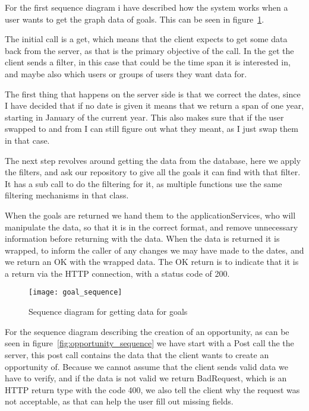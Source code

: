 For the first sequence diagram i have described how the system works when a user
wants to get the graph data of goals. This can be seen in
figure~\ref{fig:goal_sequence}.

The initial call is a get, which means that the client expects to get some data
back from the server, as that is the primary objective of the call. In the get
the client sends a filter, in this case that could be the time span it is
interested in, and maybe also which users or groups of users they want data for.

The first thing that happens on the server side is that we correct the dates,
since I have decided that if no date is given it means that we return a span of
one year, starting in January of the current year. This also makes sure that if
the user swapped to and from I can still figure out what they meant, as I just
swap them in that case. 

The next step revolves around getting the data from the database, here we apply
the filters, and ask our repository to give all the goals it can find with that
filter. It has a sub call to do the filtering for it, as multiple functions use
the same filtering mechanisms in that class.

When the goals are returned we hand them to the applicationServices, who will
manipulate the data, so that it is in the correct format, and remove unnecessary
information before returning with the data. When the data is returned it is
wrapped, to inform the caller of any changes we may have made to the dates, and
we return an OK with the wrapped data. The OK return is to indicate that it is a
return via the HTTP connection, with a status code of 200.

\begin{figure}[!htbp]
\centering
\texttt{[image: goal\_sequence]}
\caption{Sequence diagram for getting data for goals}
\label{fig:goal_sequence}
\end{figure}

For the sequence diagram describing the creation of an opportunity, as can be
seen in figure~\ref{fig:opportunity_sequence} we have start with a Post call the
the server, this post call contains the data that the client wants to create an
opportunity of. Because we cannot assume that the client sends valid data we have
to verify, and if the data is not valid we return BadRequest, which is an HTTP
return type with the code 400, we also tell the client why the request was not
acceptable, as that can help the user fill out missing fields.

